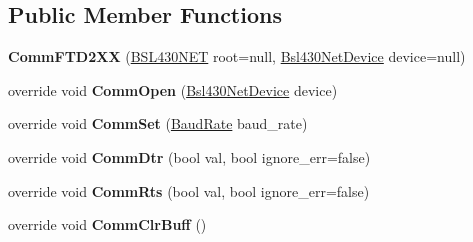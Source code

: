 \subsection*{Public Member Functions}
\begin{DoxyCompactItemize}
\item 
\mbox{\label{class_b_s_l430___n_e_t_1_1_comm_1_1_comm_f_t_d2_x_x_a82928a664be21a3cd664c7e454ff8ad1}} 
{\bfseries Comm\+F\+T\+D2\+XX} (\mbox{\hyperlink{class_b_s_l430___n_e_t_1_1_b_s_l430_n_e_t}{B\+S\+L430\+N\+ET}} root=null, \mbox{\hyperlink{class_b_s_l430___n_e_t_1_1_bsl430_net_device}{Bsl430\+Net\+Device}} device=null)
\item 
\mbox{\label{class_b_s_l430___n_e_t_1_1_comm_1_1_comm_f_t_d2_x_x_a58a7a0f0acd174873c03ccca1840f7cf}} 
override void {\bfseries Comm\+Open} (\mbox{\hyperlink{class_b_s_l430___n_e_t_1_1_bsl430_net_device}{Bsl430\+Net\+Device}} device)
\item 
\mbox{\label{class_b_s_l430___n_e_t_1_1_comm_1_1_comm_f_t_d2_x_x_a1e587254869c892e600e3248678b0dc5}} 
override void {\bfseries Comm\+Set} (\mbox{\hyperlink{namespace_b_s_l430___n_e_t_a8d30c263598635a481840944d38aeb70}{Baud\+Rate}} baud\+\_\+rate)
\item 
\mbox{\label{class_b_s_l430___n_e_t_1_1_comm_1_1_comm_f_t_d2_x_x_a8ac16a03742fe9b17c37eff783f0c5ba}} 
override void {\bfseries Comm\+Dtr} (bool val, bool ignore\+\_\+err=false)
\item 
\mbox{\label{class_b_s_l430___n_e_t_1_1_comm_1_1_comm_f_t_d2_x_x_ade3dc55cf49a30721b15811722f27d5d}} 
override void {\bfseries Comm\+Rts} (bool val, bool ignore\+\_\+err=false)
\item 
\mbox{\label{class_b_s_l430___n_e_t_1_1_comm_1_1_comm_f_t_d2_x_x_a277c28aba6a9505213c21744d451aa80}} 
override void {\bfseries Comm\+Clr\+Buff} ()
\item 
\mbox{\label{class_b_s_l430___n_e_t_1_1_comm_1_1_comm_f_t_d2_x_x_ada7719400181d96ceb15d44ca7733200}} 

\end{DoxyCompactItemize}
